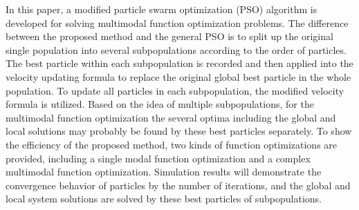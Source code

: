  \cite{PSO_IMPORTANT}
 In this paper, a modified particle swarm optimization (PSO) algorithm is developed for solving multimodal function optimization problems. The difference between the proposed method and the general PSO is to split up the original single population into several subpopulations according to the order of particles. The best particle within each subpopulation is recorded and then applied into the velocity updating formula to replace the original global best particle in the whole population. To update all particles in each subpopulation, the modified velocity formula is utilized. Based on the idea of multiple subpopulations, for the multimodal function optimization the several optima including the global and local solutions may probably be found by these best particles separately. To show the efficiency of the proposed method, two kinds of function optimizations are provided, including a single modal function optimization and a complex multimodal function optimization. Simulation results will demonstrate the convergence behavior of particles by the number of iterations, and the global and local system solutions are solved by these best particles of subpopulations.


 